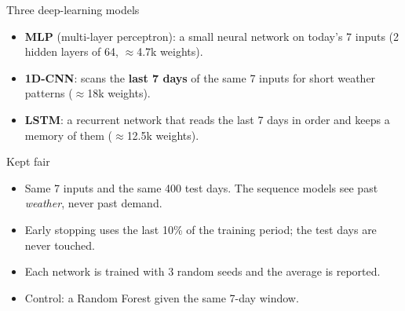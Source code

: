 \documentclass[11pt,aspectratio=169]{beamer}
\begin{document}
\begin{frame}{Three deep-learning models}
  \small
  \begin{itemize}
    \item \textbf{MLP} (multi-layer perceptron): a small neural network
      on today's 7 inputs (2 hidden layers of 64, $\approx$4.7k weights).
    \item \textbf{1D-CNN}: scans the \textbf{last 7 days} of the same 7 inputs
      for short weather patterns ($\approx$18k weights).
    \item \textbf{LSTM}: a recurrent network that reads the last 7 days
      in order and keeps a memory of them ($\approx$12.5k weights).
  \end{itemize}
  \begin{block}{Kept fair}
    \footnotesize
    \begin{itemize}
      \item Same 7 inputs and the same 400 test days. The sequence models see
        past \emph{weather}, never past demand.
      \item Early stopping uses the last 10\% of the training period; the test
        days are never touched.
      \item Each network is trained with 3 random seeds and the average is
        reported.
      \item Control: a Random Forest given the same 7-day window.
    \end{itemize}
  \end{block}
\end{frame}
\end{document}
